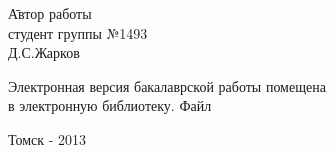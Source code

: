 \begin{tabbing}
\hspace{10cm}\=Автор работы\\
\>студент группы №1493\\
\>\makebox[3cm]{\hrulefill}Д.С.Жарков\\
\end{tabbing}

\vspace{0.8cm}

\hspace{-0.65cm}Электронная версия бакалаврской работы помещена\\
в электронную библиотеку. Файл

\vspace{1.2cm}

\begin{center}
Томск - 2013
\end{center}
\normalsize
